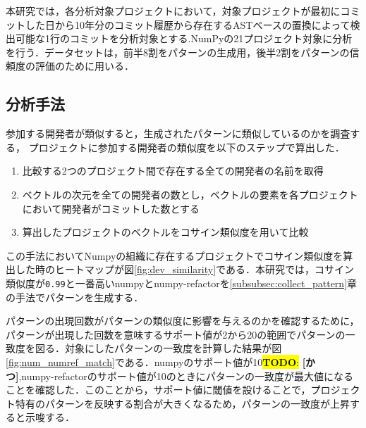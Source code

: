 \documentclass[T,J]{fose} %
\newcommand{\todo}[1]{\colorbox{yellow}{{\bf TODO}:}{\color{red} {\textbf{[#1]}}}}
\begin{document}
本研究では，各分析対象プロジェクトにおいて，対象プロジェクトが最初にコミットした日から10年分のコミット履歴から存在するASTベースの置換によって検出可能な1行のコミットを分析対象とする.NumPyの21プロジェクト対象に分析を行う．データセットは，前半8割をパターンの生成用，後半2割をパターンの信頼度の評価のために用いる．

\subsection{分析手法}
参加する開発者が類似すると，生成されたパターンに類似しているのかを調査する，
プロジェクトに参加する開発者の類似度を以下のステップで算出した．
\begin{enumerate}
    \item 比較する2つのプロジェクト間で存在する全ての開発者の名前を取得
    \item ベクトルの次元を全ての開発者の数とし，ベクトルの要素を各プロジェクトにおいて開発者がコミットした数とする
    \item 算出したプロジェクトのベクトルをコサイン類似度を用いて比較
\end{enumerate}
この手法においてNumpyの組織に存在するプロジェクトでコサイン類似度を算出した時のヒートマップが図\ref{fig:dev_similarity}である．本研究では，コサイン類似度が\texttt{0.99}と一番高いnumpyとnumpy-refactorを\ref{subsubsec:collect_pattern}章の手法でパターンを生成する．

パターンの出現回数がパターンの類似度に影響を与えるのかを確認するために，パターンが出現した回数を意味するサポート値が2から20の範囲でパターンの一致度を図る．対象にしたパターンの一致度を計算した結果が図\ref{fig:num_numref_match}である．numpyのサポート値が10\todo{かつ},numpy-refactorのサポート値が10のときにパターンの一致度が最大値になることを確認した．このことから，サポート値に閾値を設けることで，プロジェクト特有のパターンを反映する割合が大きくなるため，パターンの一致度が上昇すると示唆する．
\end{document}
